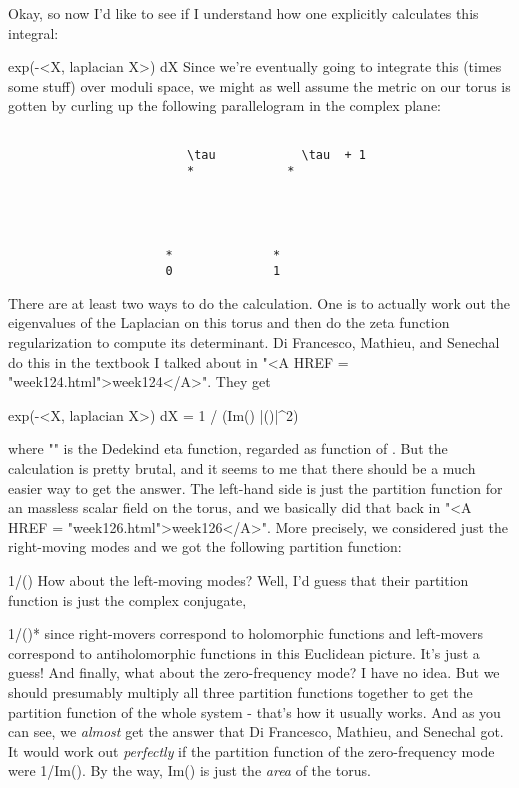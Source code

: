 Okay, so now I'd like to see if I understand how one explicitly
calculates this integral:

                 \int  exp(-<X, laplacian X>) dX
Since we're eventually going to integrate this (times some stuff) over
moduli space, we might as well assume the metric on our torus is gotten
by curling up the following parallelogram in the complex plane:



\begin{verbatim}

                         \tau            \tau  + 1 
                         *             *




                      *              *
                      0              1
\end{verbatim}
    

There are at least two ways to do the calculation.  One is to actually
work out the eigenvalues of the Laplacian on this torus and then do the
zeta function regularization to compute its determinant.  Di Francesco,
Mathieu, and Senechal do this in the textbook I talked about in "<A
HREF = "week124.html">week124</A>".  They get

      \int  exp(-<X, laplacian X>) dX = 1 / (\sqrt Im(\tau )  |\eta (\tau )|^{2})

where "\eta " is the Dedekind eta function, regarded as function
of \tau .  But the calculation is pretty brutal, and it seems to me that
there should be a much easier way to get the answer.  The left-hand side
is just the partition function for an massless scalar field on the
torus, and we basically did that back in "<A HREF =
"week126.html">week126</A>".  More precisely, we considered just
the right-moving modes and we got the following partition function:

                           1/\eta (\tau )
How about the left-moving modes?  Well, I'd guess that their partition 
function is just the complex conjugate,

                           1/\eta (\tau )*
since right-movers correspond to holomorphic functions and left-movers
correspond to antiholomorphic functions in this Euclidean picture.  It's
just a guess!  And finally, what about the zero-frequency mode?  I have
no idea.  But we should presumably multiply all three partition
functions together to get the partition function of the whole system -
that's how it usually works.  And as you can see, we \emph{almost} get the
answer that Di Francesco, Mathieu, and Senechal got.  It would work out
\emph{perfectly} if the partition function of the zero-frequency mode were
1/\sqrt Im(\tau ).  By the way, Im(\tau ) is just the \emph{area} of the
torus.

